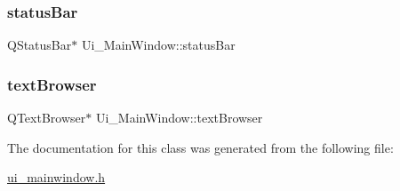 \subsubsection{\texorpdfstring{status\+Bar}{statusBar}}
{\footnotesize\ttfamily Q\+Status\+Bar$\ast$ Ui\+\_\+\+Main\+Window\+::status\+Bar}

\mbox{\label{class_ui___main_window_a2c789c07fa5fc1cee05aae8df52bb02d}} 
\subsubsection{\texorpdfstring{text\+Browser}{textBrowser}}
{\footnotesize\ttfamily Q\+Text\+Browser$\ast$ Ui\+\_\+\+Main\+Window\+::text\+Browser}



The documentation for this class was generated from the following file\+:\begin{DoxyCompactItemize}
\item 
\mbox{\hyperlink{ui__mainwindow_8h}{ui\+\_\+mainwindow.\+h}}\end{DoxyCompactItemize}

